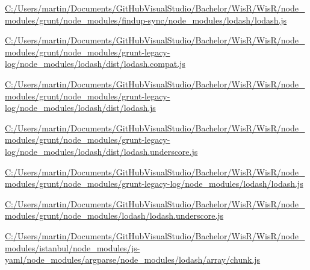 \begin{DoxyCompactItemize}
\item 
\hyperlink{_c_1_2_users_2martin_2_documents_2_git_hub_visual_studio_2_bachelor_2_wis_r_2_wis_r_2node_modulefe6016bd5b10340e7539fd49bc11122d}{C\+:/\+Users/martin/\+Documents/\+Git\+Hub\+Visual\+Studio/\+Bachelor/\+Wis\+R/\+Wis\+R/node\+\_\+modules/grunt/node\+\_\+modules/findup-\/sync/node\+\_\+modules/lodash/lodash.\+js}
\item 
\hyperlink{_c_1_2_users_2martin_2_documents_2_git_hub_visual_studio_2_bachelor_2_wis_r_2_wis_r_2node_module80d7d57e13ed3ee128fa5049a6daaf67}{C\+:/\+Users/martin/\+Documents/\+Git\+Hub\+Visual\+Studio/\+Bachelor/\+Wis\+R/\+Wis\+R/node\+\_\+modules/grunt/node\+\_\+modules/grunt-\/legacy-\/log/node\+\_\+modules/lodash/dist/lodash.\+compat.\+js}
\item 
\hyperlink{_c_1_2_users_2martin_2_documents_2_git_hub_visual_studio_2_bachelor_2_wis_r_2_wis_r_2node_module1901735849ae17364bea5e0c2676d264}{C\+:/\+Users/martin/\+Documents/\+Git\+Hub\+Visual\+Studio/\+Bachelor/\+Wis\+R/\+Wis\+R/node\+\_\+modules/grunt/node\+\_\+modules/grunt-\/legacy-\/log/node\+\_\+modules/lodash/dist/lodash.\+js}
\item 
\hyperlink{_c_1_2_users_2martin_2_documents_2_git_hub_visual_studio_2_bachelor_2_wis_r_2_wis_r_2node_modulec1891d9dcaf54a441dc76e632660906b}{C\+:/\+Users/martin/\+Documents/\+Git\+Hub\+Visual\+Studio/\+Bachelor/\+Wis\+R/\+Wis\+R/node\+\_\+modules/grunt/node\+\_\+modules/grunt-\/legacy-\/log/node\+\_\+modules/lodash/dist/lodash.\+underscore.\+js}
\item 
\hyperlink{_c_1_2_users_2martin_2_documents_2_git_hub_visual_studio_2_bachelor_2_wis_r_2_wis_r_2node_moduleb27ce9355ec7d175ce3f21e24defa851}{C\+:/\+Users/martin/\+Documents/\+Git\+Hub\+Visual\+Studio/\+Bachelor/\+Wis\+R/\+Wis\+R/node\+\_\+modules/grunt/node\+\_\+modules/grunt-\/legacy-\/log/node\+\_\+modules/lodash/lodash.\+js}
\item 
\hyperlink{_c_1_2_users_2martin_2_documents_2_git_hub_visual_studio_2_bachelor_2_wis_r_2_wis_r_2node_module90297fde802c62ef18cb50832c7aa71e}{C\+:/\+Users/martin/\+Documents/\+Git\+Hub\+Visual\+Studio/\+Bachelor/\+Wis\+R/\+Wis\+R/node\+\_\+modules/grunt/node\+\_\+modules/lodash/lodash.\+underscore.\+js}
\item 
\hyperlink{_c_1_2_users_2martin_2_documents_2_git_hub_visual_studio_2_bachelor_2_wis_r_2_wis_r_2node_module1dacf9b3929c42ed3a17c54220d9a4ba}{C\+:/\+Users/martin/\+Documents/\+Git\+Hub\+Visual\+Studio/\+Bachelor/\+Wis\+R/\+Wis\+R/node\+\_\+modules/istanbul/node\+\_\+modules/js-\/yaml/node\+\_\+modules/argparse/node\+\_\+modules/lodash/array/chunk.\+js}

\end{DoxyCompactItemize}
